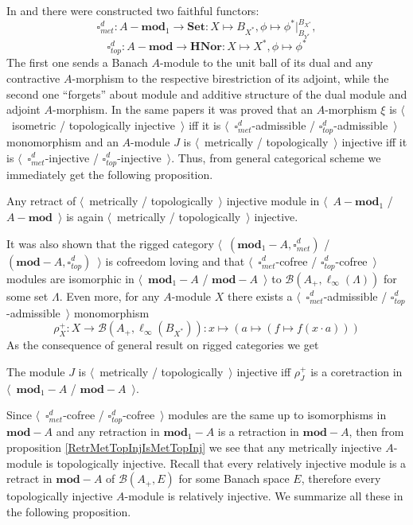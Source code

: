 In \cite{HelMetrFrQMod} and \cite{ShtTopFrClassicQuantMod} there were constructed two faithful functors:
$$
\square_{met}^d:A-\mathbf{mod}_1\to\mathbf{Set}:X\mapsto B_{X^*},\phi\mapsto\phi^*|_{B_{Y^*}}^{B_{X^*}},
$$
$$
\square_{top}^d:A-\mathbf{mod}\to\mathbf{HNor}:X\mapsto X^*,\phi\mapsto\phi^*
$$
The first one sends a Banach $A$-module to the unit ball of its dual and any contractive $A$-morphism to the respective birestriction of its adjoint, while the second one ``forgets'' about module and additive structure of the dual module and adjoint $A$-morphism.
In the same papers it was proved that an $A$-morphism $\xi$ is $\langle$~isometric / topologically injective~$\rangle$ iff it is $\langle$~$\square_{met}^d$-admissible / $\square_{top}^d$-admissible~$\rangle$ monomorphism and an $A$-module $J$ is $\langle$~metrically / topologically~$\rangle$ injective iff it is $\langle$~$\square_{met}^d$-injective / $\square_{top}^d$-injective~$\rangle$. Thus, from general categorical scheme we immediately get the following proposition.

\begin{proposition}\label{RetrMetTopInjIsMetTopInj} Any retract of $\langle$~metrically / topologically~$\rangle$ injective module in $\langle$~$A-\mathbf{mod}_1$ / $A-\mathbf{mod}$~$\rangle$ is again $\langle$~metrically / topologically~$\rangle$ injective.
\end{proposition}

It was also shown that the rigged category $\langle$~$(\mathbf{mod}_1-A,\square_{met}^d)$ / $(\mathbf{mod}-A,\square_{top}^d)$~$\rangle$ is cofreedom loving and that $\langle$~$\square_{met}^d$-cofree / $\square_{top}^d$-cofree~$\rangle$ modules are isomorphic in $\langle$~$\mathbf{mod}_1-A$ / $\mathbf{mod}-A$~$\rangle$ to $\mathcal{B}(A_+, \ell_\infty(\Lambda))$ for some set $\Lambda$. Even more, for any $A$-module $X$ there exists a $\langle$~$\square_{met}^d$-admissible / $\square_{top}^d$-admissible~$\rangle$ monomorphism
$$
\rho_X^+:X\to\mathcal{B}(A_+,\ell_\infty(B_{X^*})):x\mapsto(a\mapsto(f\mapsto f(x\cdot a)))
$$
As the consequence of general result on rigged categories we get

\begin{proposition}\label{MetTopInjModViaCanonicMorph}
The module $J$ is $\langle$~metrically / topologically~$\rangle$ injective iff $\rho_J^+$ is a coretraction in $\langle$~$\mathbf{mod}_1-A$ / $\mathbf{mod}-A$~$\rangle$.
\end{proposition}

Since $\langle$~$\square_{met}^d$-cofree / $\square_{top}^d$-cofree~$\rangle$ modules are the same up to isomorphisms in $\mathbf{mod}-A$ and any retraction in $\mathbf{mod}_1-A$ is a retraction in $\mathbf{mod}-A$, then from proposition \ref{RetrMetTopInjIsMetTopInj} we see that any metrically injective $A$-module is topologically injective. Recall that every relatively injective module is a retract in $\mathbf{mod}-A$ of $\mathcal{B}(A_+,E)$ for some Banach space $E$, therefore every topologically injective $A$-module is relatively injective. We summarize all these in the following proposition.

